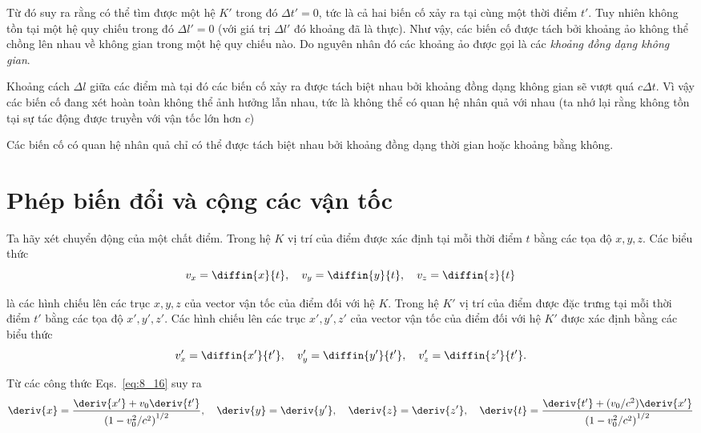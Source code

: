 \noindent
Từ đó suy ra rằng có thể tìm được một hệ $K'$ trong đó $\Delta t'=0$, tức là cả hai biến cố xảy ra tại cùng một thời điểm $t'$. Tuy nhiên không tồn tại một hệ quy chiếu trong đó $\Delta l'=0$ (với giá trị $\Delta l'$ đó khoảng đã là thực). Như vậy, các biến cố được tách bởi khoảng ảo không thể chồng lên nhau về không gian trong một hệ quy chiếu nào. Do nguyên nhân đó các khoảng ảo được gọi là các \textit{khoảng đồng dạng không gian}.

Khoảng cách $\Delta l$ giữa các điểm mà tại đó các biến cố xảy ra được tách biệt nhau bởi khoảng đồng dạng không gian sẽ vượt quá $c\Delta t$. Vì vậy các biến cố đang xét hoàn toàn không thể ảnh hưởng lẫn nhau, tức là không thể có quan hệ nhân quả với nhau (ta nhớ lại rằng không tồn tại sự tác động được truyền với vận tốc lớn hơn $c$)

Các biến cố có quan hệ nhân quả chỉ có thể được tách biệt nhau bởi khoảng đồng dạng thời gian hoặc khoảng bằng không.

\section{Phép biến đổi và cộng các vận tốc}\label{sec:8_5}

Ta hãy xét chuyển động của một chất điểm. Trong hệ $K$ vị trí của điểm được xác định tại mỗi thời điểm $t$ bằng các tọa độ $x, y, z$. Các biểu thức
\begin{equation*}
	v_x = \diffin{x}{t},\quad v_y = \diffin{y}{t},\quad v_z = \diffin{z}{t}
\end{equation*}

\noindent
là các hình chiếu lên các trục $x, y, z$ của vector vận tốc của điểm đối với hệ $K$. Trong hệ $K'$ vị trí của điểm được đặc trưng tại mỗi thời điểm $t'$ bằng các tọa độ $x', y', z'$. Các hình chiếu lên các trục $x', y', z'$ của vector vận tốc của điểm đối với hệ $K'$ được xác định bằng các biểu thức
\begin{equation*}
	v_x' = \diffin{x'}{t'},\quad v_y' = \diffin{y'}{t'},\quad v_z' = \diffin{z'}{t'}.
\end{equation*}

Từ các công thức Eqs.~\eqref{eq:8_16} suy ra
\begin{equation*}
	\deriv{x} = \frac{\deriv{x'}+v_0\deriv{t'}}{\left(1-v_0^2/c^2\right)^{1/2}},\quad \deriv{y} = \deriv{y'},\quad \deriv{z} = \deriv{z'},\quad \deriv{t} = \frac{\deriv{t'}+(v_0/c^2)\deriv{x'}}{\left(1-v_0^2/c^2\right)^{1/2}}
\end{equation*}

